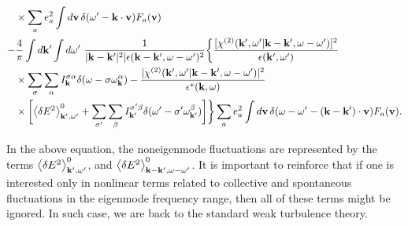 \documentclass[12pt,a4paper,ruledheader]{report}
\begin{document}
\begin{align}
  &\times\sum_ae_a^2\int d{\bf v}\, \delta(\omega '-{\bf k \cdot v})F_a({\bf v})
  \nonumber\\
-&\frac{4}{\pi}\int d{\bf k '} \int d\omega '\
\frac{1}{|{\bf k - k'}|^2|\epsilon({\bf k-k'},\omega-\omega ')^2}
\biggl\{ \frac{[\chi^{(2)}({\bf k'},\omega '|{\bf k-k'},\omega-\omega ')]^2}
   {\epsilon({\bf k'},\omega ')}\nonumber\\
  &\times\sum_{\sigma}\sum_{\alpha}
  I_{\bf k}^{\sigma \alpha}\delta(\omega-\sigma \omega_{\bf k}^\alpha)
-\frac{|\chi^{(2)}({\bf k'},\omega '|{\bf k-k'},\omega-\omega ')|^2}
{\epsilon^*({\bf k},\omega)}  \nonumber\\
&\times 
   \biggl[\left< \delta E^2 \right>_{{\bf k'},\omega '}^0
   +\sum_{\sigma '}\sum_{\beta}I_{\bf k'}^{\sigma ' \beta}
   \delta(\omega '-\sigma ' \omega_{\bf k'}^\beta)\biggr]\biggr\}
   \sum_a e_a^2\int d{\bf v}\,
   \delta(\omega-\omega '-{\bf (k-k')\cdot v})F_a({\bf v}).\nonumber
\end{align}

In the above equation, the noneigenmode fluctuations are represented
by the terms  $\left<\delta E^2 \right>_{{\bf k'}, \omega '}^0$, and
$\left< \delta E^2\right>_{{\bf k-k'},\omega-\omega '}^0$. It is important
to reinforce that if one is interested only in nonlinear terms related
to collective and spontaneous fluctuations in the eigenmode frequency
range, then all of these terms might be ignored. In such case, we are
back to the standard weak turbulence theory.
\end{document}
